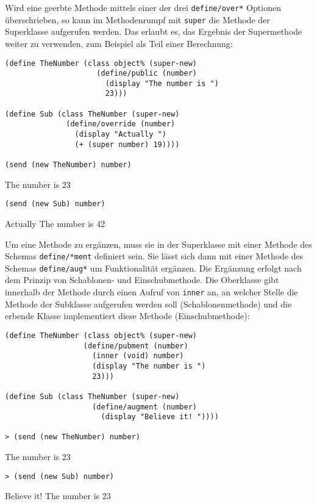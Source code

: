 Wird eine geerbte Methode mittels einer der drei \texttt{define/over*} Optionen überschrieben, so kann im Methodenrumpf mit \texttt{super} die Methode der Superklasse aufgerufen werden. Das erlaubt es, das Ergebnis der Supermethode weiter zu verwenden, zum Beispiel als Teil einer Berechnung:

\begin{lstlisting}
(define TheNumber (class object% (super-new)
                     (define/public (number)
                       (display "The number is ")
                       23)))

(define Sub (class TheNumber (super-new)
              (define/override (number)
                (display "Actually ")
                (+ (super number) 19))))

(send (new TheNumber) number)
\end{lstlisting}
{\routput The number is 23}
\begin{lstlisting}
(send (new Sub) number)
\end{lstlisting}
{\routput Actually The number is 42}

Um eine Methode zu ergänzen, muss sie in der Superklasse mit einer Methode des Schemas \texttt{define/*ment} definiert sein. Sie lässt sich dann mit einer Methode des Schemas \texttt{define/aug*} um Funktionalität ergänzen. Die Ergänzung erfolgt nach dem Prinzip von Schablonen- und Einschubmethode. Die Oberklasse gibt innerhalb der Methode durch einen Aufruf von \texttt{inner} an, an welcher Stelle die Methode der Subklasse aufgerufen werden soll (Schablonenmethode) und die erbende Klasse implementiert diese Methode (Einschubmethode):

\begin{lstlisting}
(define TheNumber (class object% (super-new)
                  (define/pubment (number)
                    (inner (void) number)
                    (display "The number is ")
                    23)))

(define Sub (class TheNumber (super-new)
                    (define/augment (number)
                      (display "Believe it! "))))
                      
> (send (new TheNumber) number)
\end{lstlisting}
{\routput The number is 23}

\begin{lstlisting}                
> (send (new Sub) number)
\end{lstlisting}
{\routput Believe it! The number is 23}

